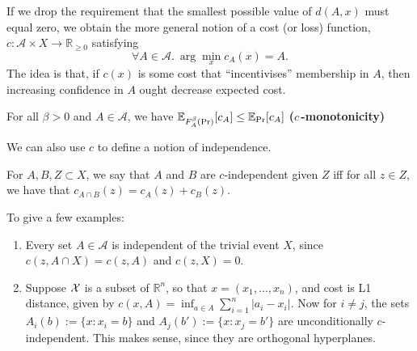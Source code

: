 \documentclass{article}
\begin{document}
\begin{wip}
If we drop the requirement that the smallest possible value of $d(A,x)$ must equal zero, we obtain the more general notion of a cost (or loss) function, $c :\mathcal A \times X \to \mathbb R_{\ge 0}$ satisfying
\[
\forall A \in \mathcal A.~\arg\min_{x} c_A(x) = A.
\]
The idea is that, if $c(x)$ is some cost that ``incentivises'' membership in $A$, then increasing confidence in $A$ ought decrease expected cost.
\begin{CFaxioms}
    \item For all $\beta > 0$ and $A\in\mathcal A$, we have
    $\operatorname*{\mathbb{E}}_{F^{\beta}_A(\Pr)} [ c_A ]
        \le
        \operatorname*{\mathbb{E}}_{\Pr}[ c_A ]
    $
        \hfill \textbf{($c$\,-monotonicity)}
\end{CFaxioms}


We can also use $c$ to define a notion of independence.

\begin{defn}[$c$-independence]
For $A,B,Z \subset X$,
we say that $A$ and $B$ are $c$-independent given $Z$ iff
for all $z \in Z$, we have that
$c_{A\cap B}(z) = c_{A}(z) + c_{B}(z)$.
\end{defn}

To give a few examples:
\begin{enumerate}
    \item Every set $A \in\mathcal A$ is independent of the trivial event $X$, since
        $
            c(z, A\cap X) = c(z, A)
        $
        and $c(z, X) = 0$.
    \item Suppose $\mathcal X$ is a subset of $\mathbb R^n$, so that $x = (x_1, \ldots, x_n)$, and cost is L1 distance, given by $c(x,A) = \inf_{a \in A} \sum_{i=1}^n {|a_i - x_i|}$. Now for $i\ne j$,
    the sets $A_i(b) := \{ x : x_i = b \}$
    and $A_j(b') := \{x : x_j = b' \}$ are unconditionally $c$-independent.
    This makes sense, since they are orthogonal hyperplanes.


\end{enumerate}
\end{wip}
\end{document}
